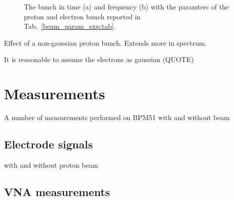 \begin{figure}[ht]
\centering
{}
\hspace{3mm}
\caption{The bunch in time (a) and frequency (b) with the paramters of the proton and electron bunch reported in Tab.~\ref{beam_param_exp:tab}.}
\label{gauss_bunch}
\end{figure}

Effect of a non-gaussian proton bunch. Extends more in spectrum.

It is reasonable to assume the electrons as gaussian (QUOTE)




\section[Measurements]{Measurements}

A number of measurements performed on BPM51 with and without beam

\subsection[Electrode signals]{Electrode signals}

with and without proton beam

\subsection[VNA measurements]{VNA measurements}


